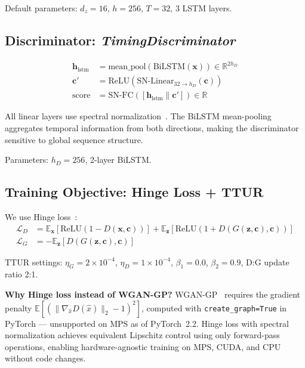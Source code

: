 \documentclass[sigconf,nonacm]{acmart}
\begin{document}
Default parameters: $d_z = 16$, $h = 256$, $T = 32$, 3 LSTM layers.

\subsection{Discriminator: \textit{TimingDiscriminator}}

\begin{align}
\mathbf{h}_\text{lstm} &= \mathrm{mean\_pool}\!\left(
  \mathrm{BiLSTM}(\mathbf{x})\right) \in \mathbb{R}^{2h_D} \\
\mathbf{c}' &= \mathrm{ReLU}\!\left(\mathrm{SN\text{-}Linear}_{32 \to h_D}(\mathbf{c})\right) \\
\mathrm{score} &= \mathrm{SN\text{-}FC}\!\left([\mathbf{h}_\text{lstm} \| \mathbf{c}']\right)
  \in \mathbb{R}
\end{align}

All linear layers use spectral normalization~\cite{miyato2018spectral}.
The BiLSTM mean-pooling aggregates temporal information from both directions,
making the discriminator sensitive to global sequence structure.

Parameters: $h_D = 256$, 2-layer BiLSTM.

\subsection{Training Objective: Hinge Loss + TTUR}

We use Hinge loss~\cite{goodfellow2014gan}:
\begin{align}
\mathcal{L}_D &= \mathbb{E}_\mathbf{x}[\mathrm{ReLU}(1 - D(\mathbf{x}, \mathbf{c}))]
              + \mathbb{E}_\mathbf{z}[\mathrm{ReLU}(1 + D(G(\mathbf{z}, \mathbf{c}), \mathbf{c}))] \\
\mathcal{L}_G &= -\mathbb{E}_\mathbf{z}[D(G(\mathbf{z}, \mathbf{c}), \mathbf{c})]
\end{align}

TTUR settings: $\eta_G = 2 \times 10^{-4}$, $\eta_D = 1 \times 10^{-4}$,
$\beta_1 = 0.0$, $\beta_2 = 0.9$, D:G update ratio 2:1.

\textbf{Why Hinge loss instead of WGAN-GP?}
WGAN-GP~\cite{arjovsky2017wgan} requires the gradient penalty
$\mathbb{E}[(\|\nabla_{\hat{x}} D(\hat{x})\|_2 - 1)^2]$, computed with
\texttt{create\_graph=True} in PyTorch --- unsupported on MPS as of
PyTorch~2.2.
Hinge loss with spectral normalization achieves equivalent Lipschitz
control using only forward-pass operations, enabling hardware-agnostic
training on MPS, CUDA, and CPU without code changes.
\end{document}
